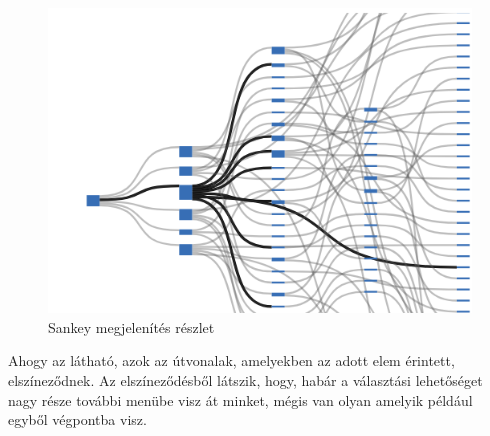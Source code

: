 		\begin{figure}[h!]
			\centering
			\includegraphics[width=1.0\linewidth]{keve_imgs/sankeymegjelenites_reszlet}
			\caption{Sankey megjelenítés részlet}
			\label{fig:sankeymegjelenites_reszlet}
		\end{figure}
		
		Ahogy az látható, azok az útvonalak, amelyekben az adott elem érintett, elszíneződnek. Az elszíneződésből látszik, hogy, habár a választási lehetőséget nagy része további menübe visz át minket, mégis van olyan amelyik például egyből végpontba visz.
	